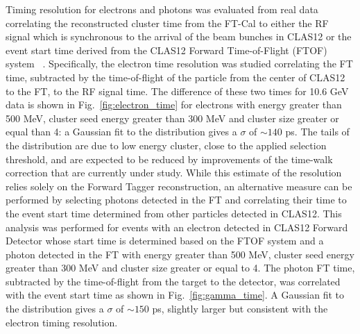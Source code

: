 Timing resolution for electrons and photons was evaluated from real data correlating the reconstructed cluster time from the FT-Cal to either the RF signal which is synchronous to the arrival of the beam bunches in CLAS12 or the event start time derived from the CLAS12 Forward Time-of-Flight (FTOF) system ~\cite{ftof}. Specifically, the electron time resolution was studied correlating the FT time, subtracted by the time-of-flight of the particle from the center of CLAS12 to the FT, to the RF signal time. The difference of these two times for 10.6 GeV data is shown in Fig.~\ref{fig:electron_time} for electrons with energy greater than 500 MeV, cluster seed energy greater than 300 MeV and cluster size greater or equal than 4: a Gaussian fit to the distribution gives a $\sigma$ of $\sim 140$ ps. The tails of the distribution are due to low energy cluster, close to the applied selection threshold, and are expected to be reduced by improvements of the time-walk correction that are currently under study. While this estimate of the resolution relies solely on the Forward Tagger reconstruction, an alternative measure can be performed by selecting photons detected in the FT and correlating their time to the event start time determined from other particles detected in CLAS12. This analysis was performed for events with an electron detected in CLAS12 Forward Detector whose start time is determined based on the FTOF system and a photon detected in the FT with energy greater than 500 MeV, cluster seed energy greater than 300 MeV and cluster size greater or equal to 4. The photon FT time, subtracted by the time-of-flight from the target to the detector, was correlated with the event start time as shown in Fig.~\ref{fig:gamma_time}. A Gaussian fit to the distribution gives a $\sigma$ of $\sim 150$ ps, slightly larger but consistent with the electron timing resolution.

